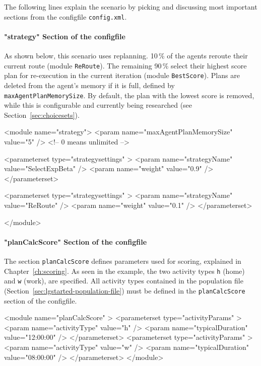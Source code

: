 The following lines explain the scenario by picking and discussing most important sections from the \gls{configfile} \lstinline|config.xml|.


\paragraph{"strategy" Section of the \protect\gls{configfile}}

As shown below, this scenario uses replanning. 10\,\% of the agents reroute their current route (module \lstinline|ReRoute|). The remaining 90\,\% select their highest score plan for re-execution in the current iteration (module \lstinline|BestScore|). Plans are deleted from the agent's memory if it is full, defined by \lstinline|maxAgentPlanMemorySize|. By default, the plan with the lowest score is removed, while this is configurable and currently being
researched (see Section~\ref{sec:choicesets}).
%
\begin{xml}
<module name="strategy">
	<param name="maxAgentPlanMemorySize" value="5" /> <!-- 0 means unlimited -->
	
	<parameterset type="strategysettings" >
		<param name="strategyName" value="SelectExpBeta" />
		<param name="weight" value="0.9" />
	</parameterset>
	
	<parameterset type="strategysettings" >
		<param name="strategyName" value="ReRoute" />
		<param name="weight" value="0.1" />
	</parameterset>
	
</module>
\end{xml}



\paragraph{"planCalcScore" Section of the \protect\gls{configfile}}

The section \lstinline|planCalcScore| defines parameters used for scoring, explained in Chapter~\ref{ch:scoring}. As seen in the example, the two activity types \lstinline|h| (home) and \lstinline|w| (work), are specified.  All activity types contained in the population file (\cf Section~\ref{sec:lgstarted-population-file}) must be defined in the \lstinline{planCalcScore} section of the \gls{configfile}.
\begin{xml}
<module name="planCalcScore" >
   <parameterset type="activityParams" >
      <param name="activityType" value="h" />
      <param name="typicalDuration" value="12:00:00" />
   </parameterset>
   <parameterset type="activityParams" >
      <param name="activityType" value="w" />
      <param name="typicalDuration" value="08:00:00" />
   </parameterset>
</module>
\end{xml}

